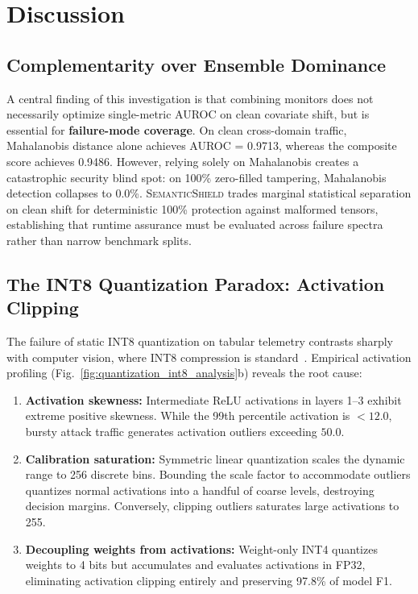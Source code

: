 \documentclass[journal]{IEEEtran}
\newcommand{\sysname}{\textsc{SemanticShield}}
\begin{document}
\section{Discussion}
\label{sec:discussion}

\subsection{Complementarity over Ensemble Dominance}
A central finding of this investigation is that combining monitors does not necessarily optimize single-metric AUROC on clean covariate shift, but is essential for \textbf{failure-mode coverage}. On clean cross-domain traffic, Mahalanobis distance alone achieves AUROC = 0.9713, whereas the composite score achieves 0.9486. However, relying solely on Mahalanobis creates a catastrophic security blind spot: on 100\% zero-filled tampering, Mahalanobis detection collapses to 0.0\%. \sysname{} trades marginal statistical separation on clean shift for deterministic 100\% protection against malformed tensors, establishing that runtime assurance must be evaluated across failure spectra rather than narrow benchmark splits.

\subsection{The INT8 Quantization Paradox: Activation Clipping}
The failure of static INT8 quantization on tabular telemetry contrasts sharply with computer vision, where INT8 compression is standard~\cite{quantedge2023}. Empirical activation profiling (Fig.~\ref{fig:quantization_int8_analysis}b) reveals the root cause:
\begin{enumerate}[leftmargin=*]
  \item \textbf{Activation skewness:} Intermediate ReLU activations in layers 1--3 exhibit extreme positive skewness. While the 99th percentile activation is $<12.0$, bursty attack traffic generates activation outliers exceeding $50.0$.
  \item \textbf{Calibration saturation:} Symmetric linear quantization scales the dynamic range to 256 discrete bins. Bounding the scale factor to accommodate outliers quantizes normal activations into a handful of coarse levels, destroying decision margins. Conversely, clipping outliers saturates large activations to 255.
  \item \textbf{Decoupling weights from activations:} Weight-only INT4 quantizes weights to 4 bits but accumulates and evaluates activations in FP32, eliminating activation clipping entirely and preserving 97.8\% of model F1.
\end{enumerate}
\end{document}
